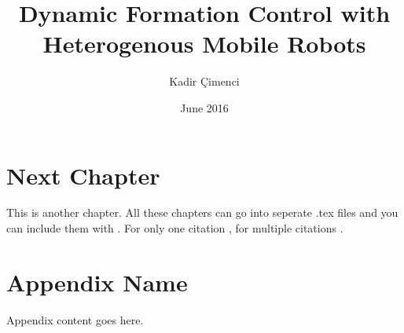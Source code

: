 \documentclass[chaparabic,ee,ms,12pt,oneandhalf]{metu}
\author{Kadir Çimenci}
\title{Dynamic Formation Control with Heterogenous Mobile Robots}
\date{June 2016}
\begin{document}
\begin{preliminaries}


\end{preliminaries}
%   
% 
%



\chapter{Next Chapter}
This is another chapter. All these chapters can go into seperate .tex files and you can include
them with \verb||. For only one citation \cite{bpeltools}, for multiple citations \cite{atkinson04,erl05,kitchenham07}.

	
%


\appendix
\chapter{Appendix Name}
Appendix content goes here.
 
%

\end{document}
